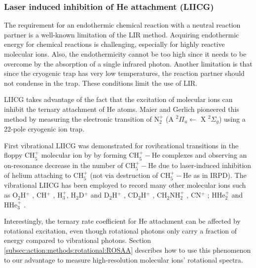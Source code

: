 \subsubsection{Laser induced inhibition of He attachment (LIICG)}
\label{subsec:action:methods:vibrational:LIICG}

The requirement for an endothermic chemical reaction with a neutral reaction partner is a well-known limitation of the LIR method. Acquiring endothermic energy for chemical reactions is challenging, especially for highly reactive molecular ions. Also, the endothermicity cannot be too high since it needs to be overcome by the absorption of a single infrared photon. Another limitation is that since the cryogenic trap has very low temperatures, the reaction partner should not condense in the trap. These conditions limit the use of LIR.

LIICG takes advantage of the fact that the excitation of molecular ions can inhibit the ternary attachment of He atoms. Maier and Gerlich \cite{chakrabarty_novel_2013} pioneered this method by measuring the electronic transition of N$_2^+$ (A $ ^2\Pi_u \leftarrow$ X $^2\Sigma_g$) using a 22-pole cryogenic ion trap.

First vibrational LIICG was demonstrated for rovibrational transitions in the floppy CH$_5^+$ molecular ion by \citet{asvany_coltrap_2014} by forming CH$_5^+-$He complexes and observing an on-resonance decrease in the number of CH$_5^+-$He due to laser-induced inhibition of helium attaching to CH$_5^+$ (not via destruction of CH$_5^+-$He as in IRPD). The vibrational LIICG has been employed to record many other molecular ions such as O$_2$H$^+$ \cite{kohguchi_high-resolution_2018}, CH$^+$ \cite{domenech_first_2018}, H$_3^+$, H$_2$D$^+$ and D$_2$H$^+$ \cite{jusko_frequency_2016}, CD$_2$H$^+$ \cite{jusko_high-resolution_2017}, CH$_2$NH$_2^+$ \cite{Markus2019}, CN$^+$ \cite{domenech_high-resolution_2020}; HHe$_2^+$ and HHe$_3^+$ \cite{topfer_spectroscopic_2020}.

Interestingly, the ternary rate coefficient for He attachment can be affected by rotational excitation, even though rotational photons only carry a fraction of energy compared to vibrational photons. Section \ref{subsec:action:methods:rotational:ROSAA} describes how to use this phenomenon to our advantage to measure high-resolution molecular ions' rotational spectra.


